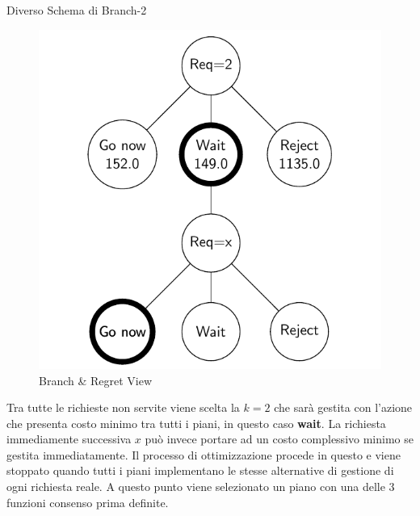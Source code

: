 \documentclass[10pt]{beamer}
\begin{document}
    \begin{frame}{Diverso Schema di Branch-2}
    \noindent\begin{minipage}{0.3\textwidth}
        \begin{figure}[h!]
            \centering
            \includegraphics[scale=0.2]{Images/Branch-And-Regret-View.png}
            \caption{Branch \& Regret View}
            \label{fig:Branch-and-RegretView}
        \end{figure}
        \end{minipage}%
        \hfill%
        \begin{minipage}{0.6\textwidth}
            Tra tutte le richieste non servite viene scelta la {\(k=2\)} che sarà gestita con l'azione che presenta costo minimo tra tutti i piani, in questo caso \textbf{wait}. La richiesta immediamente successiva $x$ può invece portare ad un costo complessivo minimo se gestita immediatamente. Il processo di ottimizzazione procede in questo e viene stoppato quando tutti i piani implementano le stesse alternative di gestione di ogni richiesta reale. A questo punto viene selezionato un piano con una delle 3 funzioni consenso prima definite.
        \end{minipage}
    \end{frame}
\end{document}
